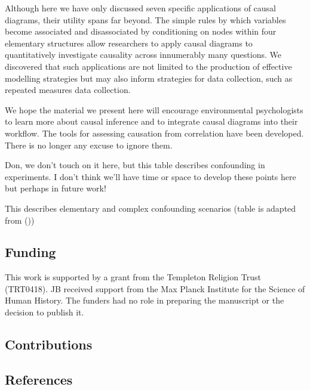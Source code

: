 \documentclass[
  singlecolumn]{article}
\begin{document}
Although here we have only discussed seven specific applications of
causal diagrams, their utility spans far beyond. The simple rules by
which variables become associated and disassociated by conditioning on
nodes within four elementary structures allow researchers to apply
causal diagrams to quantitatively investigate causality across
innumerably many questions. We discovered that such applications are not
limited to the production of effective modelling strategies but may also
inform strategies for data collection, such as repeated measures data
collection.

We hope the material we present here will encourage environmental
psychologists to learn more about causal inference and to integrate
causal diagrams into their workflow. The tools for assessing causation
from correlation have been developed. There is no longer any excuse to
ignore them.

\newpage{}

Don, we don't touch on it here, but this table describes confounding in
experiments. I don't think we'll have time or space to develop these
points here but perhaps in future work!

\begin{table}

\caption{\label{tbl-04}This describes elementary and complex confounding
scenarios (table is adapted from ())}

\centering{

\terminologyelconfoundersexperiments

}

\end{table}%

\newpage{}

\subsection{Funding}\label{funding}

This work is supported by a grant from the Templeton Religion Trust
(TRT0418). JB received support from the Max Planck Institute for the
Science of Human History. The funders had no role in preparing the
manuscript or the decision to publish it.

\subsection{Contributions}\label{contributions}

\subsection{References}\label{references}
\end{document}

